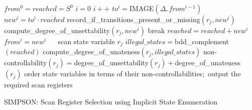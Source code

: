 \begin{algorithm}[H]
\SetAlgoNoLine
\LinesNumbered

  $from^0 = reached = S^0$\;
  $i = 0$\;
  {
  	$i++$\;
	$to^i = $IMAGE$(\Delta,from^{i-1})$\;
	$new^i = to^i \cdot \overline{reached}$\;
	{
		record\_if\_transitions\_present\_or\_missing$(r_j,new^i)$\;
		compute\_degree\_of\_unsettability$(r_j,new^i)$\;
	}
	{
		break\;
	}
	$reached = reached + new^i$\;
	$from^i = new^i$\;
  }\
  \
  {
	{
		scan state variable $r_j$\;
	}
  }
  $illegal\_states = $bdd\_complement$(reached)$\;
  {
	compute\_degree\_of\_unateness$(r_j,illegal\_states)$\;
	non-controllability$(r_j)=$degree\_of\_unsettability$(r_j)+$degree\_of\_unateness$(r_j)$\;
  }
  order state variables in terms of their non-controllabilities;\tcc{\ Sorting}\
  output the required scan registers\;
\caption {SIMPSON: Scan Register Selection using Implicit State Enumeration\cite{KallaPartialScan}}
\label{alg:SIMPSON}
\end{algorithm}
\DecMargin{1em}